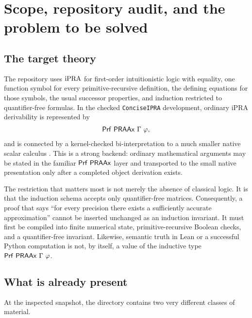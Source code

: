 \section{Scope, repository audit, and the problem to be solved}
\label{sec:scope}

\subsection{The target theory}

The repository uses \(\mathrm{iPRA}\) for first-order intuitionistic logic with equality, one function symbol for every primitive-recursive definition, the defining equations for those symbols, the usual successor properties, and induction restricted to quantifier-free formulas.  In the checked \texttt{ConciseIPRA} development, ordinary iPRA derivability is represented by
\[
   \mathsf{Prf}\ \mathsf{PRAAx}\ \Gamma\ \varphi,
\]
and is connected by a kernel-checked bi-interpretation to a much smaller native scalar calculus \cite{repo-pra-readme,repo-concise}.  This is a strong backend: ordinary mathematical arguments may be stated in the familiar \(\mathsf{Prf}\ \mathsf{PRAAx}\) layer and transported to the small native presentation only after a completed object derivation exists.

The restriction that matters most is not merely the absence of classical logic.  It is that the induction schema accepts only quantifier-free matrices.  Consequently, a proof that says ``for every precision there exists a sufficiently accurate approximation'' cannot be inserted unchanged as an induction invariant.  It must first be compiled into finite numerical state, primitive-recursive Boolean checks, and a quantifier-free invariant.  Likewise, semantic truth in Lean or a successful Python computation is not, by itself, a value of the inductive type \(\Prf\ \PRAAx\ \Gamma\ \varphi\).

\subsection{What is already present}

At the inspected snapshot, the directory contains two very different classes of material.

